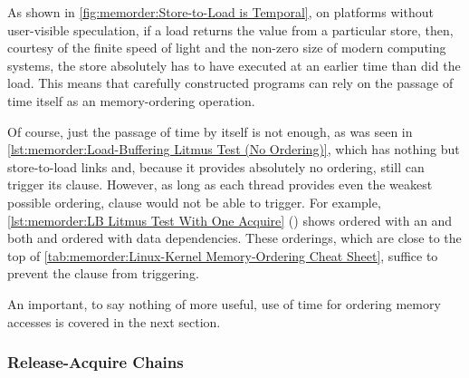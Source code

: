 As shown in
\cref{fig:memorder:Store-to-Load is Temporal},
on platforms without user-visible speculation, if a load returns the value
from a particular store, then, courtesy of the finite speed of light and
the non-zero size of modern computing systems, the store absolutely has
to have executed at an earlier time than did the load.
This means that carefully constructed programs can rely on the
passage of time itself as an memory-ordering operation.

\begin{listing}[tbp]

\caption{LB Litmus Test With One Acquire}
\label{lst:memorder:LB Litmus Test With One Acquire}
\end{listing}

Of course, just the passage of time by itself is not enough, as
was seen in
\cref{lst:memorder:Load-Buffering Litmus Test (No Ordering)},
which has nothing but store-to-load links and, because it provides
absolutely no ordering, still can trigger its  clause.
However, as long as each thread provides even the weakest possible
ordering,  clause would not be able to trigger.
For example,
\cref{lst:memorder:LB Litmus Test With One Acquire}
()
shows  ordered with an  and
both  and  ordered with data dependencies.
These orderings, which are close to the top of
\cref{tab:memorder:Linux-Kernel Memory-Ordering Cheat Sheet},
suffice to prevent the  clause from triggering.

\QuickQuizEnd

An important, to say nothing of more useful, use of time for ordering
memory accesses is covered in the next section.

\subsubsection{Release-Acquire Chains}
\label{sec:memorder:Release-Acquire Chains}

